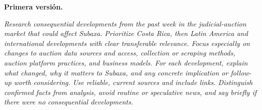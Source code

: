 \documentclass[11pt,letterpaper]{article}
\newenvironment{prompt}{%
  \begin{center}\begin{minipage}{0.92\textwidth}\color{black!80}\small
  \setlength{\parskip}{0.4em}\itshape}{%
  \end{minipage}\end{center}}
\begin{document}
\textbf{Primera versión.}
\begin{prompt}
Research consequential developments from the past week in the
judicial-auction market that could affect Subaxa. Prioritize Costa Rica, then
Latin America and international developments with clear transferable
relevance. Focus especially on changes to auction data sources and access,
collection or scraping methods, auction platform practices, and business
models. For each development, explain what changed, why it matters to Subaxa,
and any concrete implication or follow-up worth considering. Use reliable,
current sources and include links. Distinguish confirmed facts from analysis,
avoid routine or speculative news, and say briefly if there were no
consequential developments.
\end{prompt}
\end{document}
